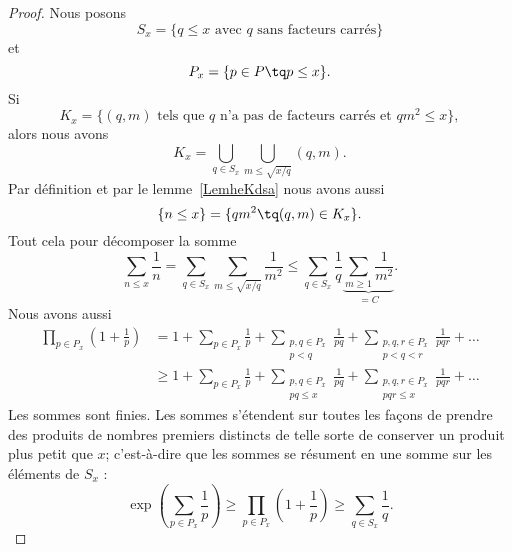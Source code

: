 \begin{proof}
	Nous posons
	\begin{equation}
		S_x=\{  q\leq x\text{ avec } q\text{ sans facteurs carrés} \}
	\end{equation}
	et
	\begin{equation}
		P_x=\{ p\in P\tq p\leq x \}.
	\end{equation}
	Si
	\begin{equation}
		K_x=\{  (q,m)\text{ tels que } q\text{ n'a pas de facteurs carrés et } qm^2\leq x \},
	\end{equation}
	alors nous avons
	\begin{equation}
		K_x=\bigcup_{q\in S_x}\bigcup_{m\leq \sqrt{x/q}}(q,m).
	\end{equation}
	Par définition et par le lemme~\ref{LemheKdsa} nous avons aussi
	\begin{equation}
		\{ n\leq x \}=\{ qm^2\tq (q,m)\in K_x \}.
	\end{equation}
	Tout cela pour décomposer la somme
	\begin{equation}        \label{EqpoJpuC}
		\sum_{n\leq x}\frac{1}{ n }=\sum_{q\in S_x}\sum_{m\leq\sqrt{x/q}}\frac{1}{ m^2 }\leq \sum_{q\in S_x}\frac{1}{ q }\underbrace{\sum_{m\geq 1}\frac{1}{ m^2 }}_{=C}.
	\end{equation}
	Nous avons aussi
	\begin{subequations}
		\begin{align}
			\prod_{p\in P_x}\left( 1+\frac{1}{ p } \right) & =1+\sum_{p\in P_x}\frac{1}{ p }+\sum_{\substack{p,q\in P_x     \\p<q}}\frac{1}{ pq }+\sum_{\substack{p,q,r\in P_x\\p<q<r}}\frac{1}{ pqr }+\ldots\\
			                                               & \geq 1+\sum_{p\in P_x}\frac{1}{ p }+\sum_{\substack{p,q\in P_x \\pq\leq x}}\frac{1}{ pq }+\sum_{\substack{p,q,r\in P_x\\pqr\leq x}}\frac{1}{ pqr }+\ldots
		\end{align}
	\end{subequations}
	Les sommes sont finies. Les sommes s'étendent sur toutes les façons de prendre des produits de nombres premiers distincts de telle sorte de conserver un produit plus petit que \( x\); c'est-à-dire que les sommes se résument en une somme sur les éléments de \( S_x\) :
	\begin{equation}        \label{EqooilOz}
		\exp\left( \sum_{p\in P_x}\frac{1}{ p } \right)\geq\prod_{p\in P_x}\left( 1+\frac{1}{ p } \right)\geq \sum_{q\in S_x}\frac{1}{ q }.

\end{equation}
\end{proof}
